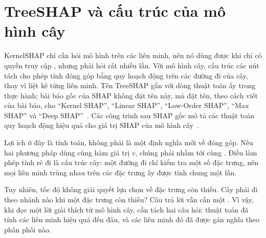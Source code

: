 \section{TreeSHAP và cấu trúc của mô hình cây}
\label{sec:ch04-treeshap}

%
KernelSHAP chỉ cần hỏi mô hình trên các liên minh, nên nó dùng được khi chỉ có
quyền truy cập , nhưng phải hỏi rất nhiều lần. Với mô
hình cây, cấu trúc các nút tách
cho phép tính đóng góp bằng quy hoạch động trên các đường đi của cây, thay vì
liệt kê từng liên minh. Tên TreeSHAP gắn với dòng thuật toán ấy trong thực
hành; bài báo gốc của SHAP không đặt tên này, mà đặt tên, theo cách viết của
bài báo, cho \enquote{Kernel SHAP}, \enquote{Linear SHAP}, \enquote{Low-Order
SHAP}, \enquote{Max SHAP} và \enquote{Deep SHAP}~\autocite{p10shap}. Các công trình sau
SHAP gốc mô tả các thuật toán quy hoạch động hiệu quả cho giá trị SHAP của mô
hình cây~\autocite{p19shapinference}.

Lợi ích ở đây là tính toán, không phải là một định nghĩa mới về đóng góp. Nếu
hai phương pháp dùng cùng hàm giá trị $v$, chúng phải nhắm tới cùng
. Điều làm phép tính rẻ đi là cấu trúc cây:
một đường đi chỉ kiểm tra một số đặc trưng, nên mọi liên minh trùng nhau trên
các đặc trưng ấy được tính chung một lần.

Tuy nhiên, tốc độ không giải quyết lựa chọn về đặc trưng còn thiếu. Cây phải
đi theo nhánh nào khi một đặc trưng còn thiếu? Câu trả lời vẫn cần một
. Vì vậy, khi đọc một lời giải thích từ mô hình cây, cần tách
hai câu hỏi: thuật toán đã tính các liên minh hiệu quả đến đâu, và các liên
minh đó đã được gán nghĩa theo phân phối nào.
